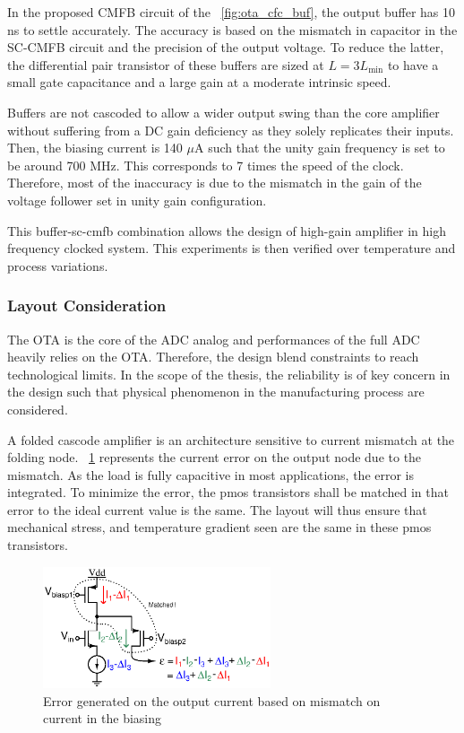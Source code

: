 In the proposed CMFB circuit of the \figurename~\ref{fig:ota_cfc_buf}, the output buffer has 10 ns to settle accurately. The accuracy is based on the mismatch in capacitor in the SC-CMFB circuit and the precision of the output voltage. To reduce the latter, the differential pair transistor of these buffers are sized at \(L = 3 L_{\min} \) to have a small gate capacitance and a large gain at a moderate intrinsic speed. 

Buffers are not cascoded to allow a wider output swing than the core amplifier without suffering from a DC gain deficiency as they solely replicates their inputs. Then, the biasing current is 140 \(\mu \)A such that the unity gain frequency is set to be around 700 MHz. This corresponds to 7 times the speed of the clock. Therefore, most of the inaccuracy is due to the mismatch in the gain of the voltage follower set in unity gain configuration.

This buffer-sc-cmfb combination allows the design of high-gain amplifier in high frequency clocked system. This experiments is then verified over temperature and process variations.

\subsubsection{Layout Consideration}
The OTA is the core of the ADC analog and performances of the full ADC heavily relies on the OTA\@. Therefore, the design blend constraints to reach technological limits. In the scope of the thesis, the reliability is of key concern in the design such that physical phenomenon in the manufacturing process are considered.

A folded cascode amplifier is an architecture sensitive to current mismatch at the folding node. \figurename~\ref{fig:folded-node-mismatch} represents the current error on the output node due to the mismatch. As the load is fully capacitive in most applications, the error is integrated. To minimize the error, the pmos transistors shall be matched in that error to the ideal current value is the same. The layout will thus ensure that mechanical stress, and temperature gradient seen are the same in these pmos transistors.

\begin{figure}[htp]
    \centering
    \includegraphics[width=0.6\textwidth]{Chapter7/Figs/folded-mismatch-gradient.ps}
    \caption{Error generated on the output current based on mismatch on current in the biasing}
    \label{fig:folded-node-mismatch}
\end{figure}

